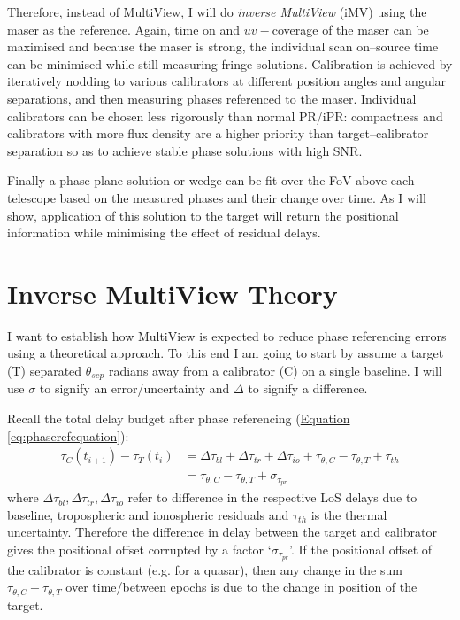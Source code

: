 	Therefore, instead of MultiView, I will do \textit{inverse MultiView} (iMV) using the maser as the reference. Again, time on and $uv-$coverage of the maser can be maximised and because the maser is strong, the individual scan on--source time can be minimised while still measuring fringe solutions. Calibration is achieved by iteratively nodding to various calibrators at different position angles and angular separations, and then measuring phases referenced to the maser. Individual calibrators can be chosen less rigorously than normal PR/iPR: compactness and calibrators with more flux density are a higher priority than target--calibrator separation so as to achieve stable phase solutions with high SNR.
	
	Finally a phase plane solution or wedge can be fit over the FoV above each telescope based on the measured phases and their change over time. As I will show, application of this solution to the target will return the positional information while minimising the effect of residual delays.

\section{Inverse MultiView Theory} \label{sec:advpr}
	I want to establish how MultiView is expected to reduce phase referencing errors using a theoretical approach. To this end I am going to start by assume a target (T) separated $\theta_{sep}$ radians away from a calibrator (C) on a single baseline. I will use $\sigma$ to signify an error/uncertainty and $\Delta$ to signify a difference. 
	
	Recall the total delay budget after phase referencing (\hyperref[eq:phaserefequation]{Equation \ref*{eq:phaserefequation}}):
	\begin{equation}
	\begin{split}
	\tau_C(t_{i+1})-\tau_T(t_{i}) &= \Delta\tau_{bl}+\Delta\tau_{tr}+\Delta\tau_{io}+\tau_{\theta,C}-\tau_{\theta,T}+\tau_{th} \\
	& = \tau_{\theta,C}-\tau_{\theta,T} + \sigma_{\tau_{pr}}
	\label{eq:delaybudget}
	\end{split}
	\end{equation} where $\Delta\tau_{bl},\Delta\tau_{tr},\Delta\tau_{io}$ refer to difference in the respective LoS delays due to baseline, tropospheric and ionospheric residuals and $\tau_{th}$ is the thermal uncertainty. Therefore the difference in delay between the target and calibrator gives the positional offset corrupted by a factor `$\sigma_{\tau_{pr}}$'. If the positional offset of the calibrator is constant (e.g. for a quasar), then any change in the sum $\tau_{\theta,C}-\tau_{\theta,T}$ over time/between epochs is due to the change in position of the target.
	
